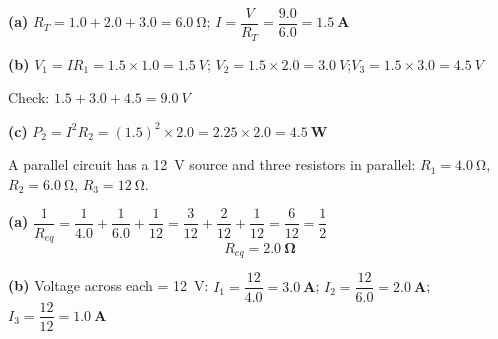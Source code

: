 \documentclass[addpoints]{exam}
\begin{document}
\begin{questions}
\begin{solution}[9cm]
\textbf{(a)} $R_T = 1.0 + 2.0 + 3.0 = \SI{6.0}{\ohm}$;\quad
$I = \dfrac{V}{R_T} = \dfrac{9.0}{6.0} = \mathbf{\SI{1.5}{A}}$

\textbf{(b)} $V_1 = IR_1 = 1.5 \times 1.0 = \SI{1.5}{V}$;\quad
$V_2 = 1.5 \times 2.0 = \SI{3.0}{V}$;\quad $V_3 = 1.5 \times 3.0 = \SI{4.5}{V}$

Check: $1.5 + 3.0 + 4.5 = \SI{9.0}{V}$ \checkmark

\textbf{(c)} $P_2 = I^2 R_2 = (1.5)^2 \times 2.0 = 2.25 \times 2.0 = \mathbf{\SI{4.5}{W}}$
\end{solution}

\question A parallel circuit has a \SI{12}{V} source and three resistors in parallel:
$R_1 = \SI{4.0}{\ohm}$, $R_2 = \SI{6.0}{\ohm}$, $R_3 = \SI{12}{\ohm}$.
\begin{solution}[9cm]
\textbf{(a)} $\dfrac{1}{R_{eq}} = \dfrac{1}{4.0} + \dfrac{1}{6.0} + \dfrac{1}{12}
= \dfrac{3}{12} + \dfrac{2}{12} + \dfrac{1}{12} = \dfrac{6}{12} = \dfrac{1}{2}$
\[
R_{eq} = \mathbf{\SI{2.0}{\ohm}}
\]

\textbf{(b)} Voltage across each = \SI{12}{V}:
$I_1 = \dfrac{12}{4.0} = \mathbf{\SI{3.0}{A}}$;\quad
$I_2 = \dfrac{12}{6.0} = \mathbf{\SI{2.0}{A}}$;\quad
$I_3 = \dfrac{12}{12} = \mathbf{\SI{1.0}{A}}$


\end{solution}
\end{questions}
\end{document}
